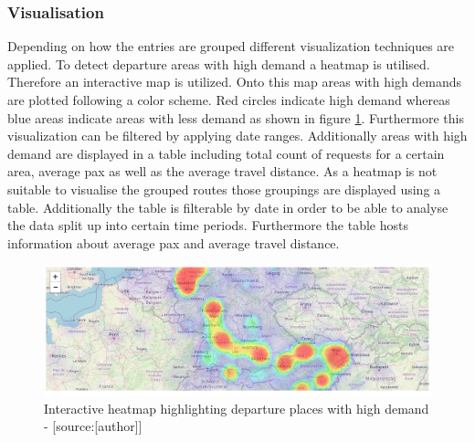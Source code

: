 \subsubsection{Visualisation}
Depending on how the entries are grouped different visualization techniques are applied. To detect departure areas with high demand a heatmap is utilised. Therefore an interactive map is utilized. Onto this map areas with high demands are plotted following a color scheme. Red circles indicate high demand whereas blue areas indicate areas with less demand as shown in figure \ref{fig:heatmap_dep}. Furthermore this visualization can be filtered by applying date ranges. Additionally areas with high demand are displayed in a table including total count of requests for a certain area, average pax as well as the average travel distance.
\newline
As a heatmap is not suitable to visualise the grouped routes those groupings are displayed using a table. Additionally the table is filterable by date in order to be able to analyse the data split up into certain time periods. Furthermore the table hosts information about average pax and average travel distance. 
\begin{figure}[H]
	\centering
		\includegraphics[width=15cm]{images/heatmap_dep}
	\caption{Interactive heatmap highlighting departure places with high demand - [source:[author]]}
	\label{fig:heatmap_dep}
\end{figure}


